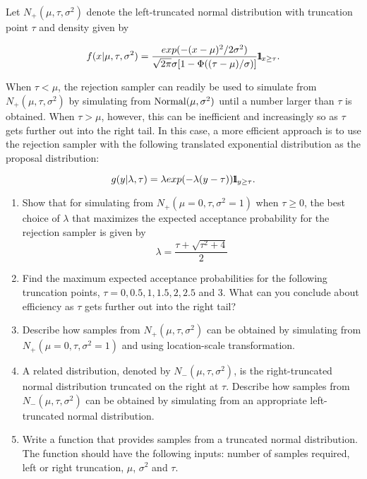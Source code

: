 \begin{labwork}
Let $N_+(\mu,\tau,\sigma^2)$ denote the left-truncated normal distribution with truncation point $\tau$ and density given by

$$f(x|\mu,\tau,\sigma^2)=\frac{exp(-(x-\mu)^2/2\sigma^2)}{\sqrt{2\pi}\sigma[1-\Phi((\tau-\mu)/\sigma)]}{1}\mspace{-11 mu}{1}_{x\geq\tau}.$$

When $\tau<\mu$, the rejection sampler can readily be used to simulate from $N_+(\mu,\tau,\sigma^2)$ by simulating from $\mbox{{\rm Normal}}(\mu,\sigma^2)$ until a number larger than $\tau$ is obtained. When $\tau>\mu$, however, this can be inefficient and increasingly so as $\tau$ gets further out into the right tail. In this case, a more efficient approach is to use the rejection sampler with the following translated exponential distribution as the proposal distribution:

$$g(y|\lambda,\tau)={\lambda}exp(-\lambda(y-\tau)){1}\mspace{-11 mu}{1}_{y\geq\tau}.$$

\begin{enumerate}
\item Show that for simulating from $N_+(\mu=0,\tau,\sigma^2=1)$ when $\tau\geq0$, the best choice of $\lambda$ that maximizes the expected acceptance probability for the rejection sampler is given by
$$\lambda=\frac{\tau+\sqrt{\tau^2+4}}{2}$$
\item Find the maximum expected acceptance probabilities for the following truncation points, $\tau=0,0.5,1,1.5,2,2.5$ and 3. What can you conclude about efficiency as $\tau$ gets further out into the right tail?
\item Describe how samples from $N_+(\mu,\tau,\sigma^2)$ can be obtained by simulating from $N_+(\mu=0,\tau,\sigma^2=1)$ and using location-scale transformation.
\item A related distribution, denoted by $N_-(\mu,\tau,\sigma^2)$, is the right-truncated normal distribution truncated on the right at $\tau$. Describe how samples from $N_-(\mu,\tau,\sigma^2)$ can be obtained by simulating from an appropriate left-truncated normal distribution.
\item Write a \Matlab function that provides samples from a truncated normal distribution. The function should have the following inputs: number of samples required, left or right truncation, $\mu$, $\sigma^2$ and $\tau$.
\end{enumerate}
\end{labwork}

